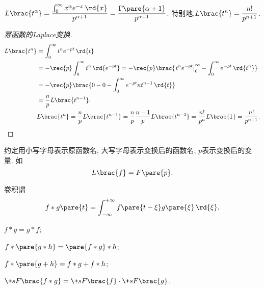 \documentclass[../ComplexVariable.tex]{subfiles}
\begin{document}
\begin{sample}
    \begin{ex}
        $\displaystyle L\brac{t^\alpha} = \frac{\int_0^\infty x^\alpha e^{-x}\,\rd{x}}{p^{\alpha+1}} = \frac{\Gamma\pare{\alpha+1}}{p^{\alpha+1}}$.
        特别地,$\displaystyle L\brac{t^n} = \frac{n!}{p^{n+1}}$.
    \end{ex}
    \begin{proof}[幂函数的Laplace变换]
        \begin{align*}
            L\brac{t^n} &= \int_0^\infty t^n e^{-pt}\,\rd{t} \\ &= -\rec{p}\int_0^\infty t^n \,\rd{e^{-pt}} = -\rec{p}\brac{\left. t^n e^{-pt}\right\vert_0^\infty - \int_0^\infty e^{-pt}\,\rd{t^n}} \\
            &= -\rec{p} \brac{0 - 0 - \int_0^\infty e^{-pt}nt^{n-1}\,\rd{t}} \\
            &= \frac{n}{p}L\brac{t^{n-1}}. \\
            & L\brac{t^n} = \frac{n}{p}L\brac{t^{n-1}} = \frac{n}{p}\frac{n-1}{p} L\brac{t^{n-2}} = \frac{n!}{p^n} L\brac{1} = \frac{n!}{p^{n+1}}. \qedhere
        \end{align*}
    \end{proof}
\end{sample}
约定用小写字母表示原函数名, 大写字母表示变换后的函数名, $p$表示变换后的变量. 如
\[ L\brac{f} = F\pare{p}. \]
\begin{definition}
    卷积谓
    \[ f*g\pare{t} = \int_{-\infty}^{+\infty} f\pare{t-\xi}g\pare{\xi}\,\rd{\xi}. \]
\end{definition}
\begin{proposition}[卷积的性质]
    \mbox{}
    \begin{cenum}
        \item $f*g = g*f$;
        \item $f*\pare{g*h} = \pare{f*g}*h$;
        \item $f*\pare{g+h} = f*g + f*h$;
        \item $\+sF\brac{f*g} = \+sF\brac{f}\cdot\+sF\brac{g}$.
    \end{cenum}
\end{proposition}
\end{document}
